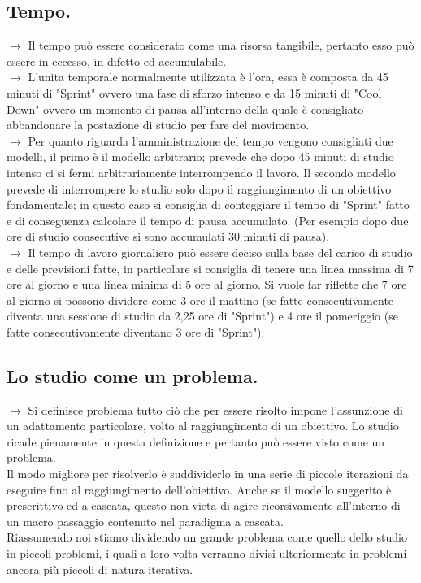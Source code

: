 \documentclass[11pt,a4paper]{article}
\begin{document}
\subsection{Tempo.}
$\rightarrow$ Il tempo può essere considerato come una risorsa tangibile, pertanto esso può essere in eccesso, in difetto ed accumulabile.\\
$\rightarrow$ L'unita temporale normalmente utilizzata è l'ora, essa è composta da 45 minuti di "Sprint" ovvero una fase di sforzo intenso e da 15 minuti di "Cool Down" ovvero un momento di pausa all'interno della quale è consigliato abbandonare la postazione di studio per fare del movimento. \\
$\rightarrow$ Per quanto riguarda l'amministrazione del tempo vengono consigliati due modelli, il primo è il  modello arbitrario; prevede che dopo 45 minuti di studio intenso ci si fermi arbitrariamente interrompendo il lavoro. Il secondo modello prevede di interrompere lo studio solo dopo il raggiungimento di un obiettivo fondamentale; in questo caso si consiglia di conteggiare il tempo di "Sprint" fatto e di conseguenza calcolare il tempo di pausa accumulato. (Per esempio dopo due ore di studio consecutive si sono accumulati 30 minuti di pausa).\\
$\rightarrow$ Il tempo di lavoro giornaliero può essere deciso sulla base del carico di studio e delle previsioni fatte, in particolare si consiglia di tenere una linea massima di 7 ore al giorno e una linea minima di 5 ore al giorno. Si vuole far riflette che 7 ore al giorno si possono dividere come 3 ore il mattino (se fatte consecutivamente diventa una sessione di studio da 2,25 ore di "Sprint") e 4 ore il pomeriggio (se fatte consecutivamente diventano 3 ore di "Sprint").\\

\subsection{Lo studio come un problema.} 
$\rightarrow$ Si definisce problema tutto ciò che per essere risolto impone l'assunzione di un adattamento particolare, volto al raggiungimento di un obiettivo. Lo studio ricade pienamente in questa definizione e pertanto può essere visto come un problema.\\
Il modo migliore per risolverlo è suddividerlo in una serie di piccole iterazioni da eseguire fino al raggiungimento dell'obiettivo. Anche se il modello suggerito è prescrittivo ed a cascata, questo non vieta di agire ricorsivamente all'interno di un macro passaggio contenuto nel paradigma a cascata.\\
Riassumendo noi stiamo dividendo un grande problema come quello dello studio in piccoli problemi, i quali a loro volta verranno divisi ulteriormente in problemi ancora più piccoli di natura iterativa.\\ 
\end{document}
